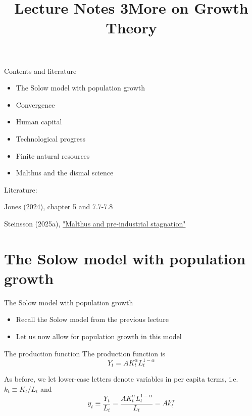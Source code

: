 \documentclass[10pt]{beamer}
\title{Lecture Notes 3\newline More on Growth Theory}
\begin{document}
\maketitle

\begin{frame}{Contents and literature}
    \begin{itemize}
        \item The Solow model with population growth
        \item Convergence
        \item Human capital
        \item Technological progress 
        \item Finite natural resources
        \item Malthus and the dismal science
    \end{itemize}\bigskip

    Literature: 
    \small{
    \begin{tightitemize}
        \item Jones (2024), chapter 5 and 7.7-7.8
        \item *Steinsson (2025a), \href{https://eml.berkeley.edu/~jsteinsson/teaching/malthus.pdf}{"Malthus and pre-industrial stagnation"}
    \end{tightitemize}
}
\end{frame}


\section{The Solow model with population growth}


\begin{frame}{The Solow model with population growth}
\begin{itemize}
    \item Recall the Solow model from the previous lecture\medskip
    \item Let us now allow for population growth in this model
\end{itemize}
\end{frame}


\begin{frame}{The production function}
    The production function is
    \begin{equation}\label{eq19}
        Y_t=A K_t^{\alpha} L_t^{1-\alpha}
    \end{equation}\medskip

    As before, we let lower-case letters denote variables in per capita terms, i.e. $k_t \equiv K_t/L_t$ and 
    \begin{equation}\label{eq20}
        y_t \equiv \frac{Y_t}{L_t}=\frac{A K_t^{\alpha} L_t^{1-\alpha}}{L_t} = A k_t^{\alpha}
    \end{equation}

\end{frame}
\end{document}
